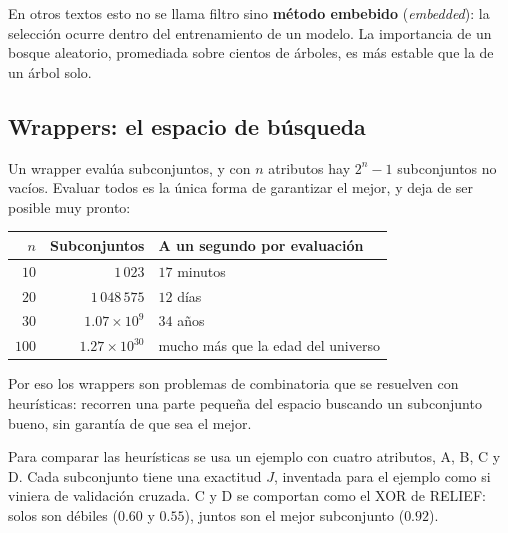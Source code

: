 \documentclass[11pt,letterpaper]{article}
\begin{document}
\begin{ojo}
    En otros textos esto no se llama filtro sino \textbf{método
    embebido} (\textit{embedded}): la selección ocurre dentro del
    entrenamiento de un modelo. La importancia de un bosque aleatorio,
    promediada sobre cientos de árboles, es más estable que la de un
    árbol solo.
\end{ojo}


\subsection*{Wrappers: el espacio de búsqueda}

Un wrapper evalúa subconjuntos, y con $n$ atributos hay $2^n - 1$
subconjuntos no vacíos. Evaluar todos es la única forma de garantizar
el mejor, y deja de ser posible muy pronto:

\begin{center}
\small
\begin{tabular}{rrl}
    \toprule
    $n$ & \textbf{Subconjuntos} & \textbf{A un segundo por evaluación} \\
    \midrule
    $10$  & $1\,023$ & $17$ minutos \\
    $20$  & $1\,048\,575$ & $12$ días \\
    $30$  & $1.07 \times 10^{9}$ & $34$ años \\
    $100$ & $1.27 \times 10^{30}$ & mucho más que la edad del universo \\
    \bottomrule
\end{tabular}
\end{center}

Por eso los wrappers son problemas de combinatoria que se resuelven con
heurísticas: recorren una parte pequeña del espacio buscando un
subconjunto bueno, sin garantía de que sea el mejor.

Para comparar las heurísticas se usa un ejemplo con cuatro atributos,
A, B, C y D. Cada subconjunto tiene una exactitud $J$, inventada para
el ejemplo como si viniera de validación cruzada. C y D se comportan
como el XOR de RELIEF: solos son débiles ($0.60$ y $0.55$), juntos son
el mejor subconjunto ($0.92$).
\end{document}

